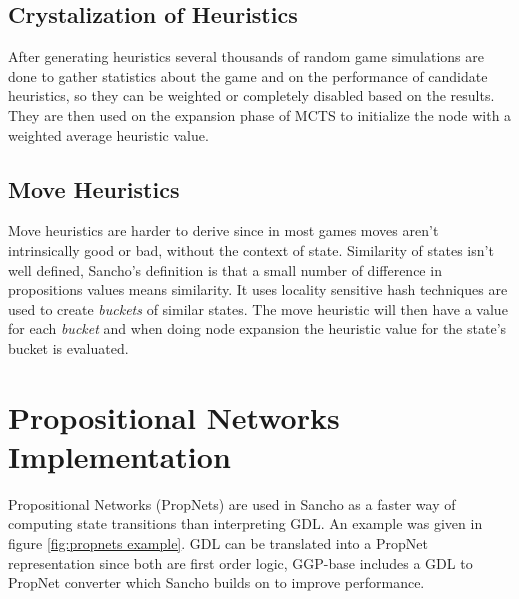 \subsection{Crystalization of Heuristics}
After generating heuristics several thousands of random game simulations are done to gather statistics about the game and on the performance of candidate heuristics, so they can be weighted or completely disabled based on the results. They are then used  on the expansion phase of MCTS to initialize the node with a weighted average heuristic value.


\subsection{Move Heuristics}
Move heuristics are harder to derive since in most games moves aren't intrinsically good or bad, without the context of state. 
Similarity of states isn't well defined, Sancho's definition is that a small number of difference in propositions values means similarity. 
It uses locality sensitive hash techniques are used to create \textit{buckets} of similar states.
The move heuristic will then have a value for each \textit{bucket} and when doing node expansion the heuristic value for the state's bucket is evaluated.


\section{Propositional Networks Implementation}

Propositional Networks (PropNets) are used in Sancho as a faster way of computing state transitions than interpreting GDL. An example was given in  figure \ref{fig:propnets example}.
GDL can be translated into a PropNet representation since both are first order logic, GGP-base includes a GDL to PropNet converter which Sancho builds on to improve performance.


